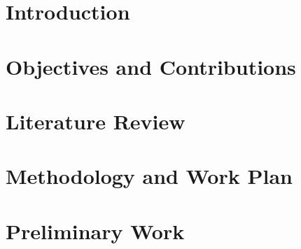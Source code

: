 \documentclass[11pt,a4paper,twoside,openright]{report}
\begin{document}
	





	\newpage

	\chapter{Introduction}
	


	\chapter{Objectives and Contributions}
	

	\chapter{Literature Review}
	

	
	\newpage

	
	\newpage

	
	
	\newpage

	
	\newpage


	
	\newpage

	



	\chapter{Methodology and Work Plan}
	

	\chapter{Preliminary Work}
	



	
	\renewcommand{\bibname}{References}
	

	\indent
\end{document}
